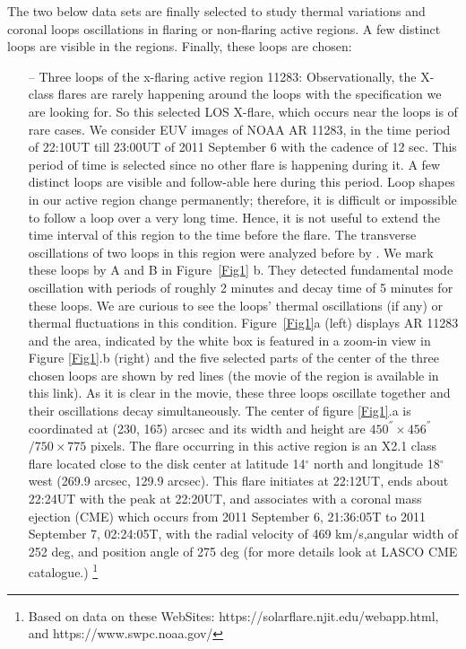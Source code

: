 \documentclass[oneside,onecolumn]{article}
\begin{document}
The two below data sets are finally selected to study thermal variations and coronal loops oscillations in flaring or non-flaring active regions. A few distinct loops are visible in the regions. Finally, these loops are chosen: 
\begin{itemize}
\item[--]
Three loops of the x-flaring active region 11283: Observationally, the X-class flares are rarely happening around the loops with the specification we are looking for. So this selected LOS X-flare, which occurs near the loops is of rare cases. We consider EUV images of NOAA AR 11283, in the time period of 22:10UT till 23:00UT of 2011 September 6 with the cadence of 12 sec. This period of time is selected since no other flare is happening during it. A few distinct loops are visible and follow-able here during this period. Loop shapes in our active region change permanently; therefore, it is difficult or impossible to follow a loop over a very long time. Hence, it is not useful to extend the time interval of this region to the time before the flare. The transverse oscillations of two loops in this region were analyzed before by  \citet{ref:Jain2015}. We mark these loops by A and B in Figure~\ref{Fig1} b. They detected fundamental mode oscillation with periods of roughly 2 minutes and decay time of 5 minutes for these loops. We are curious to see the loops' thermal oscillations (if any) or thermal fluctuations in this condition. Figure~\ref{Fig1}a (left) displays AR 11283 and the area, indicated by the white box is featured in a zoom-in view in Figure \ref{Fig1}.b (right)  and the five selected parts of the center of the three chosen loops are shown by red lines (the movie of the region is available in this link). As it is clear in the movie, these three loops oscillate together and their oscillations decay simultaneously. The center of figure \ref{Fig1}.a is coordinated at (230, 165) arcsec and its width and height are $450^{''}\times 456^{''}$ ${/}750\times 775$ pixels. The flare occurring in this active region is an X2.1 class flare located close to the disk center at latitude 14$^\circ$ north and longitude 18$^\circ$ west (269.9 arcsec, 129.9 arcsec). This flare initiates at 22:12UT, ends about 22:24UT with the peak at 22:20UT, and associates with a coronal mass ejection (CME) which occurs from 2011 September 6, 21:36:05T to 2011 September 7, 02:24:05T, with the radial velocity of 469 km/s,angular width of 252 deg, and position angle of 275 deg (for more details look at LASCO CME catalogue.) 
\footnote{Based on data on these WebSites: https://solarflare.njit.edu/webapp.html, and https://www.swpc.noaa.gov/} 


\end{itemize}
\end{document}
